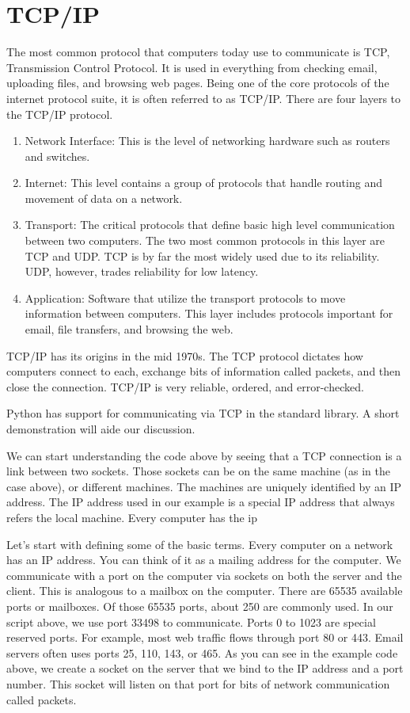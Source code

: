 \section*{TCP/IP}
The most common protocol that computers today use to communicate is TCP, Transmission Control Protocol.
It is used in everything from checking email, uploading files, and browsing web pages.
Being one of the core protocols of the internet protocol suite, it is often referred to as TCP/IP.
There are four layers to the TCP/IP protocol.
\begin{enumerate}
\item Network Interface: This is the level of networking hardware such as routers and switches.
\item Internet: This level contains a group of protocols that handle routing and movement of data on a network.
\item Transport: The critical protocols that define basic high level communication between two computers.
The two most common protocols in this layer are TCP and UDP.  TCP is by far the most widely used due to its reliability.
UDP, however, trades reliability for low latency.
\item Application: Software that utilize the transport protocols to move information between computers.
This layer includes protocols important for email, file transfers, and browsing the web.
\end{enumerate}

TCP/IP has its origins in the mid 1970s.
The TCP protocol dictates how computers connect to each, exchange bits of information called packets, and then close the connection.
TCP/IP is very reliable, ordered, and error-checked.

Python has support for communicating via TCP in the standard library.
A short demonstration will aide our discussion.




We can start understanding the code above by seeing that a TCP connection is a link between two sockets.
Those sockets can be on the same machine (as in the case above), or different machines.
The machines are uniquely identified by an IP address.
The IP address used in our example is a special IP address that always refers the local machine.
Every computer has the ip


Let's start with defining some of the basic terms.
Every computer on a network has an IP address.
You can think of it as a mailing address for the computer.
We communicate with a port on the computer via sockets on both the server and the client.
This is analogous to a mailbox on the computer.
There are 65535 available ports or mailboxes.
Of those 65535 ports, about 250 are commonly used.
In our script above, we use port 33498 to communicate.
Ports 0 to 1023 are special reserved ports.
For example, most web traffic flows through port 80 or 443.
Email servers often uses ports 25, 110, 143, or 465.
As you can see in the example code above, we create a socket on the server that we bind to the IP address and a port number.
This socket will listen on that port for bits of network communication called packets.

